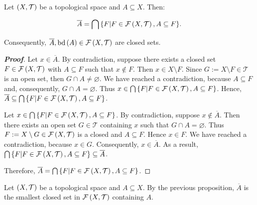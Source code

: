 \begin{proposition}
  Let $\left(X,\mathcal{T}\right)$ be a topological space and $A\subseteq X$. Then:
  
  \begin{equation}
    \overline{A}=\bigcap{\left\{F\middle|F\in\mathcal{F}\left(X,\mathcal{T}\right),A\subseteq F\right\}}. 
  \end{equation}
  
  Consequently, $\overline{A},\operatorname{bd}\left(A\right)\in\mathcal{F}\left(X,\mathcal{T}\right)$ are closed sets.
  \begin{proof}[\rm\textbf{Proof}]
    Let $x\in\overline{A}$. By contradiction, suppose there exists a closed set $F\in\mathcal{F}\left(X,\mathcal{T}\right)$ with $A\subseteq F$ such that $x\notin F$. Then $x\in X\setminus F$. Since $G:=X\setminus F\in\mathcal{T}$ is an open set, then $G\cap A\neq\varnothing$. We have reached a contradiction, because $A\subseteq F$ and, consequently, $G\cap A=\varnothing$. Thus $x\in\bigcap{\left\{F\middle|F\in\mathcal{F}\left(X,\mathcal{T}\right),A\subseteq F\right\}}$. Hence, $\overline{A}\subseteq\bigcap{\left\{F\middle|F\in\mathcal{F}\left(X,\mathcal{T}\right),A\subseteq F\right\}}$.

    Let $x\in\bigcap{\left\{F\middle|F\in\mathcal{F}\left(X,\mathcal{T}\right),A\subseteq F\right\}}$. By contradiction, suppose $x\notin\overline{A}$. Then there exists an open set $G\in\mathcal{T}$ containing $x$ such that $G\cap A=\varnothing$. Thus $F:=X\setminus G\in\mathcal{F}\left(X,\mathcal{T}\right)$ is a closed and $A\subseteq F$. Hence $x\in F$. We have reached a contradiction, because $x\in G$. Consequently, $x\in\overline{A}$. As a result, $\bigcap{\left\{F\middle|F\in\mathcal{F}\left(X,\mathcal{T}\right),A\subseteq F\right\}}\subseteq\overline{A}$.

    Therefore, $\overline{A}=\bigcap{\left\{F\middle|F\in\mathcal{F}\left(X,\mathcal{T}\right),A\subseteq F\right\}}$.
  \end{proof}
\end{proposition}

\begin{remark}
  Let $\left(X,\mathcal{T}\right)$ be a topological space and $A\subseteq X$. By the previous proposition, $\overline{A}$ is the smallest closed set in $\mathcal{F}\left(X,\mathcal{T}\right)$ containing $A$.
\end{remark}


